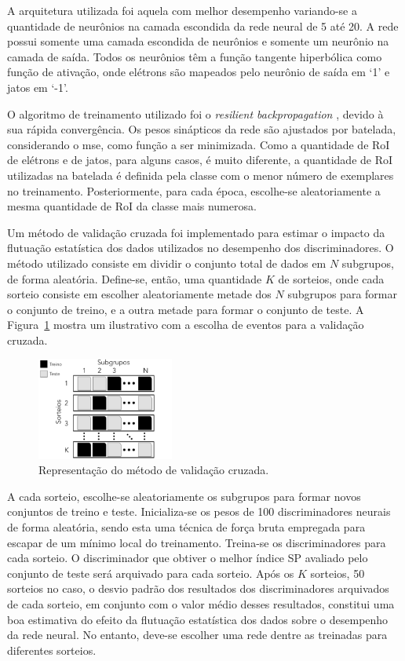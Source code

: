 A arquitetura utilizada foi aquela com melhor desempenho variando-se a quantidade de neurônios na camada escondida da rede neural de 5 até 20.
A rede possui somente uma camada escondida de neurônios e somente um neurônio na camada de saída. Todos os neurônios têm a função tangente hiperbólica 
como função de ativação, onde elétrons são mapeados pelo neurônio de saída em ‘1’ e jatos em ‘-1’.

O algoritmo de treinamento utilizado foi o \textit{resilient backpropagation}  \cite{rprop}, devido à sua rápida convergência.  Os pesos sinápticos da rede são ajustados por batelada, considerando 
o \gls{mse}, como função a ser minimizada. Como a quantidade de RoI de elétrons e de jatos, para alguns casos, é muito diferente, a 
quantidade de RoI utilizadas na batelada é definida pela classe com o menor número de exemplares no treinamento. Posteriormente, para cada época, escolhe-se aleatoriamente 
a mesma quantidade de RoI da classe mais numerosa.

Um método de validação cruzada foi implementado para estimar o impacto da flutuação estatística dos dados utilizados no desempenho dos discriminadores. O método utilizado 
consiste em dividir o conjunto total de dados em $N$ subgrupos, de forma aleatória. Define-se, então, uma quantidade $K$ de sorteios, onde cada sorteio consiste em escolher 
aleatoriamente metade dos $N$ subgrupos para formar o conjunto de treino, e a outra metade para formar o conjunto de teste. A Figura~\ref{fig:crossval} mostra um ilustrativo com a escolha 
de eventos para a validação cruzada.

\begin{figure}[h!t]
\centering
\includegraphics[width=0.4\textwidth]{figures/kfouldFigure.pdf}
\caption[Representação do método de validação cruzada.]{Representação do método de validação cruzada.}
\label{fig:crossval}
\end{figure}

A cada sorteio, escolhe-se aleatoriamente os subgrupos para formar novos conjuntos de treino e teste. Inicializa-se os pesos de 100 discriminadores neurais de forma aleatória, sendo
esta uma técnica de força bruta empregada para escapar de um mínimo local do treinamento. Treina-se os discriminadores para cada sorteio. O discriminador que obtiver o melhor índice SP
avaliado pelo conjunto de teste será arquivado para cada sorteio. Após os $K$ sorteios, 50 sorteios no caso, o desvio padrão dos resultados dos discriminadores arquivados de cada sorteio, em 
conjunto com o valor médio desses resultados, constitui uma boa estimativa do efeito da flutuação estatística dos dados sobre o desempenho da rede neural. No entanto, deve-se escolher 
uma rede dentre as treinadas para diferentes sorteios.


